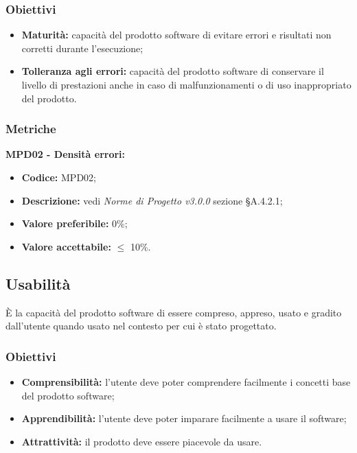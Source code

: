 \subsubsection{Obiettivi}
\begin{itemize}
    \item \textbf{Maturità:} capacità del prodotto software di evitare errori e risultati non corretti durante l’esecuzione;
    \item \textbf{Tolleranza agli errori:} capacità del prodotto software di conservare il livello di prestazioni
          anche in caso di malfunzionamenti o di uso inappropriato del prodotto.
\end{itemize}
\subsubsection{Metriche}
\textbf{MPD02 - Densità errori:}
\begin{itemize}
    \item \textbf{Codice:} MPD02;
    \item \textbf{Descrizione:} vedi \textit{Norme di Progetto v3.0.0} sezione \S A.4.2.1;
    \item \textbf{Valore preferibile:} 0\%;
    \item \textbf{Valore accettabile:} $\leq$ 10\%.
\end{itemize}
\subsection{Usabilità}
È la capacità del prodotto software di essere compreso, appreso, usato e gradito dall’utente quando usato nel contesto per cui è stato progettato.
\subsubsection{Obiettivi}
\begin{itemize}
    \item \textbf{Comprensibilità:} l'utente deve poter comprendere facilmente i concetti base del prodotto software;
    \item \textbf{Apprendibilità:} l'utente deve poter imparare facilmente a usare il software;
    \item \textbf{Attrattività:} il prodotto deve essere piacevole da usare.
\end{itemize}

